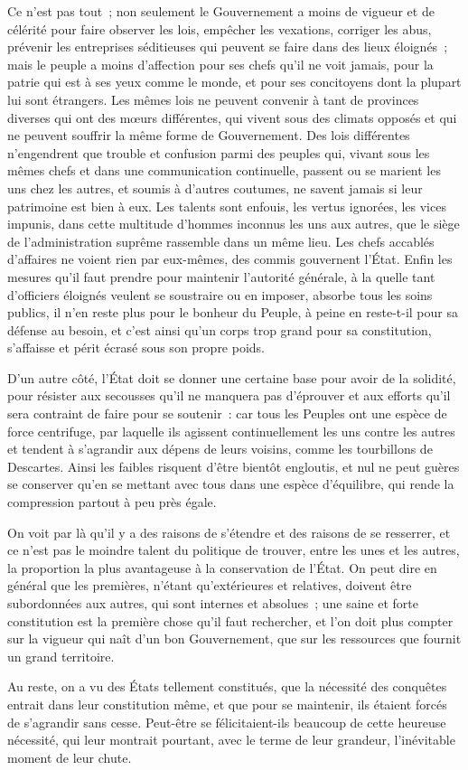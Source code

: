 \documentclass[french,twoside]{book} %
\begin{document}
Ce n’est pas tout ; non seulement le Gouvernement a moins de vigueur et de célérité pour faire observer les lois, empêcher les vexations, corriger les abus, prévenir les entreprises séditieuses qui peuvent se faire dans des lieux éloignés ; mais le peuple a moins d’affection pour ses chefs qu’il ne voit jamais, pour la patrie qui est à ses yeux comme le monde, et pour ses concitoyens dont la plupart lui sont étrangers. Les mêmes lois ne peuvent convenir à tant de provinces diverses qui ont des mœurs différentes, qui vivent sous des climats opposés et qui ne peuvent souffrir la même forme de Gouvernement. Des lois différentes n’engendrent que trouble et confusion parmi des peuples qui, vivant sous les mêmes chefs et dans une communication continuelle, passent ou se marient les uns chez les autres, et soumis à d’autres coutumes, ne savent jamais si leur patrimoine est bien à eux. Les talents sont enfouis, les vertus ignorées, les vices impunis, dans cette multitude d’hommes inconnus les uns aux autres, que le siège de l’administration suprême rassemble dans un même lieu. Les chefs accablés d’affaires ne voient rien par eux-mêmes, des commis gouvernent l’État. Enfin les mesures qu’il faut prendre pour maintenir l’autorité générale, à la quelle tant d’officiers éloignés veulent se soustraire ou en imposer, absorbe tous les soins publics, il n’en reste plus pour le bonheur du Peuple, à peine en reste-t-il pour sa défense au besoin, et c’est ainsi qu’un corps trop grand pour sa constitution, s’affaisse et périt écrasé sous son propre poids.\par
D’un autre côté, l’État doit se donner une certaine base pour avoir de la solidité, pour résister aux secousses qu’il ne manquera pas d’éprouver et aux efforts qu’il sera contraint de faire pour se soutenir : car tous les Peuples ont une espèce de force centrifuge, par laquelle ils agissent continuellement les uns contre les autres et tendent à s’agrandir aux dépens de leurs voisins, comme les tourbillons de Descartes. Ainsi les faibles risquent d’être bientôt engloutis, et nul ne peut guères se conserver qu’en se mettant avec tous dans une espèce d’équilibre, qui rende la compression partout à peu près égale.\par
On voit par là qu’il y a des raisons de s’étendre et des raisons de se resserrer, et ce n’est pas le moindre talent du politique de trouver, entre les unes et les autres, la proportion la plus avantageuse à la conservation de l’État. On peut dire en général que les premières, n’étant qu’extérieures et relatives, doivent être subordonnées aux autres, qui sont internes et absolues ; une saine et forte constitution est la première chose qu’il faut rechercher, et l’on doit plus compter sur la vigueur qui naît d’un bon Gouvernement, que sur les ressources que fournit un grand territoire.\par
Au reste, on a vu des États tellement constitués, que la nécessité des conquêtes entrait dans leur constitution même, et que pour se maintenir, ils étaient forcés de s’agrandir sans cesse. Peut-être se félicitaient-ils beaucoup de cette heureuse nécessité, qui leur montrait pourtant, avec le terme de leur grandeur, l’inévitable moment de leur chute.
\end{document}
